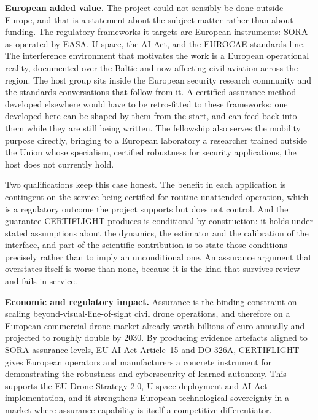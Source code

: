 \documentclass[11pt,a4paper]{article}
\begin{document}
\textbf{European added value.} The project could not sensibly be done outside
Europe, and that is a statement about the subject matter rather than about
funding. The regulatory frameworks it targets are European instruments: SORA as
operated by EASA, U-space, the AI Act, and the EUROCAE standards line. The
interference environment that motivates the work is a European operational
reality, documented over the Baltic and now affecting civil aviation across the
region. The host group sits inside the European security research community and
the standards conversations that follow from it. A certified-assurance method
developed elsewhere would have to be retro-fitted to these frameworks; one
developed here can be shaped by them from the start, and can feed back into them
while they are still being written. The fellowship also serves the mobility
purpose directly, bringing to a European laboratory a researcher trained outside
the Union whose specialism, certified robustness for security applications, the
host does not currently hold.

Two qualifications keep this case honest. The benefit in each application is
contingent on the service being certified for routine unattended operation,
which is a regulatory outcome the project supports but does not control. And the
guarantee CERTIFLIGHT produces is conditional by construction: it holds under
stated assumptions about the dynamics, the estimator and the calibration of the
interface, and part of the scientific contribution is to state those conditions
precisely rather than to imply an unconditional one. An assurance argument that
overstates itself is worse than none, because it is the kind that survives
review and fails in service.

\textbf{Economic and regulatory impact.} Assurance is the binding constraint on scaling beyond-visual-line-of-sight civil drone operations, and therefore on a European commercial drone market already worth billions of euro annually and projected to roughly double by 2030. By producing evidence artefacts aligned to SORA assurance levels, EU AI Act Article~15 and DO-326A, CERTIFLIGHT gives European operators and manufacturers a concrete instrument for demonstrating the robustness and cybersecurity of learned autonomy. This supports the EU Drone Strategy 2.0, U-space deployment and AI Act implementation, and it strengthens European technological sovereignty in a market where assurance capability is itself a competitive differentiator.

\end{document}
